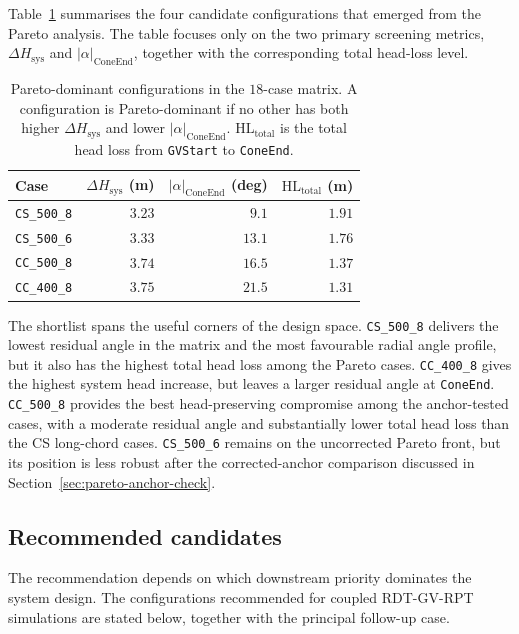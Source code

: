 Table~\ref{tab:final-decision} summarises the four candidate configurations
that emerged from the Pareto analysis. The table focuses only on the two
primary screening metrics, \(\Delta H_{\mathrm{sys}}\) and
\(|\alpha|_{\mathrm{ConeEnd}}\), together with the corresponding total
head-loss level.

\begin{table}[H]
\centering
\small
\caption[Pareto-dominant configurations]{Pareto-dominant configurations in the $18$-case matrix. A configuration is Pareto-dominant if no other has both higher $\Delta H_{\mathrm{sys}}$ and lower $|\alpha|_{\mathrm{ConeEnd}}$. $\mathrm{HL_{total}}$ is the total head loss from \texttt{GVStart} to \texttt{ConeEnd}.}
\label{tab:final-decision}
\begin{tabular}{l r r r}
\hline
Case & \(\Delta H_{\mathrm{sys}}\) (m) 
& \(|\alpha|_{\mathrm{ConeEnd}}\) (deg) 
& \(\mathrm{HL_{total}}\) (m) \\
\hline
\texttt{CS\_500\_8} & \(3.23\) & \(9.1\)  & \(1.91\) \\
\texttt{CS\_500\_6} & \(3.33\) & \(13.1\) & \(1.76\) \\
\texttt{CC\_500\_8} & \(3.74\) & \(16.5\) & \(1.37\) \\
\texttt{CC\_400\_8} & \(3.75\) & \(21.5\) & \(1.31\) \\
\hline
\end{tabular}
\end{table}

The shortlist spans the useful corners of the design space. \texttt{CS\_500\_8}
delivers the lowest residual angle in the matrix and the most favourable radial
angle profile, but it also has the highest total head loss among the Pareto
cases. \texttt{CC\_400\_8} gives the highest system head increase, but leaves a
larger residual angle at \texttt{ConeEnd}. \texttt{CC\_500\_8} provides the
best head-preserving compromise among the anchor-tested cases, with a moderate
residual angle and substantially lower total head loss than the CS long-chord
cases. \texttt{CS\_500\_6} remains on the uncorrected Pareto front, but its
position is less robust after the corrected-anchor comparison discussed in
Section~\ref{sec:pareto-anchor-check}.

\subsection{Recommended candidates}
\label{sec:recommended-candidates}

The recommendation depends on which downstream priority dominates the system design. The configurations recommended for coupled RDT-GV-RPT simulations are stated below, together with the principal follow-up case.


